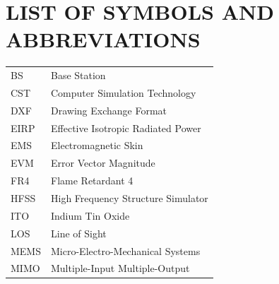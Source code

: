 \section*{LIST OF SYMBOLS AND ABBREVIATIONS}
 {}

\begin{tabular}{ l l }
\hspace{1cm} BS & \hspace{2cm} Base Station \\
\hspace{1cm} CST & \hspace{2cm} Computer Simulation Technology \\
\hspace{1cm} DXF & \hspace{2cm} Drawing Exchange Format \\
\hspace{1cm} EIRP & \hspace{2cm} Effective Isotropic Radiated Power \\
\hspace{1cm} EMS & \hspace{2cm} Electromagnetic Skin \\
\hspace{1cm} EVM & \hspace{2cm} Error Vector Magnitude \\
\hspace{1cm} FR4 & \hspace{2cm} Flame Retardant 4 \\
\hspace{1cm} HFSS & \hspace{2cm} High Frequency Structure Simulator \\
\hspace{1cm} ITO & \hspace{2cm} Indium Tin Oxide \\
\hspace{1cm} LOS & \hspace{2cm} Line of Sight \\
\hspace{1cm} MEMS & \hspace{2cm} Micro-Electro-Mechanical Systems \\
\hspace{1cm} MIMO & \hspace{2cm} Multiple-Input Multiple-Output \\

\end{tabular}
